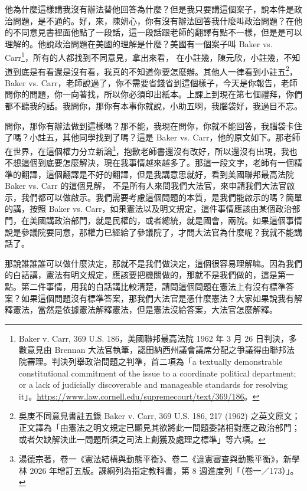 \hypertarget{c08:cue:33}{}他為什麼這樣講我沒有辦法替他回答為什麼？但是我只要講這個案子，說本件是政治問題，是不通的。好，來，陳妍心，你有沒有辦法回答我什麼叫政治問題？在他的不同意見書裡面他點了一段話，這一段話跟老師的翻譯有點不一樣，但是是可以理解的。他說政治問題在美國的理解是什麼？美國有一個案子叫 Baker vs. Carr\footnote{Baker v. Carr, 369 U.S. 186，美國聯邦最高法院 1962 年 3 月 26 日判決，多數意見由 Brennan 大法官執筆，認田納西州議會議席分配之爭議得由聯邦法院審理。判決列舉政治問題之判準，首二項為「a textually demonstrable constitutional commitment of the issue to a coordinate political department; or a lack of judicially discoverable and manageable standards for resolving it」。\url{https://www.law.cornell.edu/supremecourt/text/369/186}。}，所有的人都找到不同意見，拿出來看，
\hypertarget{c08:cue:34}{}在小註幾，陳元欣，小註幾，不知道到底是有看還是沒有看，我真的不知道你要怎麼辦。其他人一律看到小註五\footnote{吳庚不同意見書註五錄 Baker v. Carr, 369 U.S. 186, 217 (1962) 之英文原文；正文譯為「由憲法之明文規定已顯見其欲將此一問題委諸相對應之政治部門；或者欠缺解決此一問題所須之司法上創獲及處理之標準」等六項。}，Baker vs. Carr，老師說過了，你不需要省錢省到這個樣子，今天是你報告，老師問你的問題，你一向著找，所以你必須印出紙本。上課上到現在第七個禮拜，你們都不聽我的話。我問你，那你有本事你就說，小助五啊，我腦袋好，我過目不忘。

\hypertarget{c08:cue:35}{}問你，那你有辦法做到這樣嗎？那不能，我現在問你，你就不能回答，我腦袋卡住了嗎？小註五，其他同學找到了嗎？這是 Baker vs. Carr，他的原文如下。那老師在世界，在這個權力分立新論\footnote{湯德宗著，卷一《憲法結構與動態平衡》、卷二《違憲審查與動態平衡》，新學林 2026 年增訂五版。課綱列為指定教科書，第 8 週進度列「（卷一／173）」。}，抱歉老師書還沒有改好，所以還沒有出現，我也不想這個到底要怎麼解決，現在我事情越來越多了。那這一段文字，老師有一個精準的翻譯，這個翻譯是不好的翻譯，但是我講意思就好，看到美國聯邦最高法院 Baker vs. Carr 的這個見解，
\hypertarget{c08:cue:36}{}不是所有人來問我們大法官，來申請我們大法官啟示，我們都可以做啟示。我們需要考慮這個問題的本質，是我們能啟示的嗎？簡單的講，按照 Baker vs. Carr，如果憲法以及明文規定，這件事情應該由某個政治部門，在美國講政治部門，就是民權的，或者總統，就是國會，兩院。如果這個事情說是參議院要同意，那權力已經給了參議院了，才問大法官為什麼呢？我就不能講話了。

\hypertarget{c08:cue:37}{}那說誰誰誰可以做什麼決定，那就不是我們做決定，這個很容易理解嘛。因為我們的白話講，憲法有明文規定，應該要把機關做的，那就不是我們做的，這是第一點。第二件事情，用我的白話講比較清楚，請問這個問題在憲法上有沒有標準答案？如果這個問題沒有標準答案，那我們大法官是憑什麼憲法？大家如果說我有解釋憲法，當然是依據憲法解釋憲法，但是憲法沒給答案，大法官怎麼解釋。


